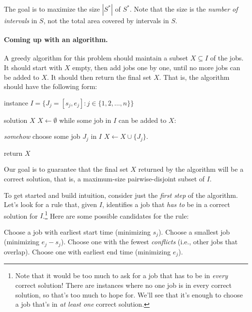 The goal is to maximize the size $|S^*|$ of $S^*$.
Note that the size is the \emph{number of intervals} in $S$,
not the total area covered by intervals in $S$.

\paragraph{Coming up with an algorithm.}

A greedy algorithm for this problem should maintain a subset $X\subseteq I$ of the jobs.
It should start with $X$ empty, then add jobs one by one,
until no more jobs can be added to $X$.
It should then return the final set $X$.
That is, the algorithm should have the following form:

\smallskip

\begin{myframed}
  \begin{steps}
  \item[\bf input:]  instance $I=\big\{J_j = [s_j,e_j] : j\in\{1,2,\ldots,n\}\big\}$
  \item[\bf output:] solution $X$
    \step $X \leftarrow \emptyset$ 
     while some job in $I$ can be added to $X$:
    \begin{block}
       \emph{somehow} choose some job $J_j$ in $I$ 
      \step $X \leftarrow X \cup \{J_j\}$.
    \end{block}
    \step return $X$
  \end{steps}
\end{myframed}

Our goal is to guarantee that the final set $X$ returned by the algorithm will be a correct solution,
that is, a maximum-size pairwise-disjoint subset of $I$.

To get started and build intuition, consider just the \emph{first step} of the algorithm.
Let's look for a rule that, given $I$, 
identifies a job that \emph{has to} be in a correct solution for $I$.\footnote
{Note that it would be too much to ask for a job that has to be in \emph{every} correct solution!
There are instances where no one job is in every correct solution,
so that's too much to hope for.
We'll see that it's enough to choose a job that's in \emph{at least one} correct solution.}
Here are some possible candidates for the rule:
\begin{steps}
  \step Choose a job with earliest start time (minimizing $s_j$). 
  \step Choose a smallest job (minimizing $e_j - s_j$).
  \step Choose one with the fewest \emph{conflicts}
  (i.e., other jobs that overlap).
  \step Choose one with earliest end time (minimizing $e_j$). 
\end{steps}

